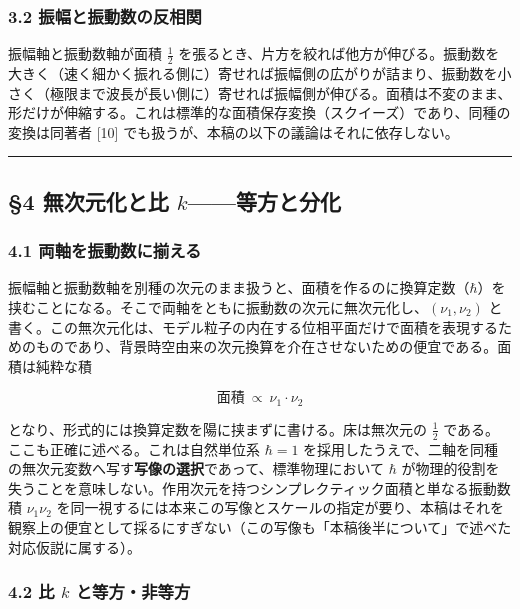 \documentclass[
]{ltjsarticle}
\begin{document}
\subsubsection{3.2
振幅と振動数の反相関}\label{ux632fux5e45ux3068ux632fux52d5ux6570ux306eux53cdux76f8ux95a2}

振幅軸と振動数軸が面積 \(\tfrac12\)
を張るとき、片方を絞れば他方が伸びる。振動数を大きく（速く細かく振れる側に）寄せれば振幅側の広がりが詰まり、振動数を小さく（極限まで波長が長い側に）寄せれば振幅側が伸びる。面積は不変のまま、形だけが伸縮する。これは標準的な面積保存変換（スクイーズ）であり、同種の変換は同著者
{[}10{]} でも扱うが、本稿の以下の議論はそれに依存しない。

\begin{center}\rule{0.5\linewidth}{0.5pt}\end{center}

\subsection{\texorpdfstring{§4 無次元化と比
\(k\)------等方と分化}{§4 無次元化と比 k------等方と分化}}\label{ux7121ux6b21ux5143ux5316ux3068ux6bd4-kux7b49ux65b9ux3068ux5206ux5316}

\subsubsection{4.1
両軸を振動数に揃える}\label{ux4e21ux8ef8ux3092ux632fux52d5ux6570ux306bux63c3ux3048ux308b}

振幅軸と振動数軸を別種の次元のまま扱うと、面積を作るのに換算定数（\(\hbar\)）を挟むことになる。そこで両軸をともに振動数の次元に無次元化し、\((\nu_1,\nu_2)\)
と書く。この無次元化は、モデル粒子の内在する位相平面だけで面積を表現するためのものであり、背景時空由来の次元換算を介在させないための便宜である。面積は純粋な積

\[\text{面積}\ \propto\ \nu_1\cdot\nu_2\]

となり、形式的には換算定数を陽に挟まずに書ける。床は無次元の
\(\tfrac12\) である。ここも正確に述べる。これは自然単位系 \(\hbar=1\)
を採用したうえで、二軸を同種の無次元変数へ写す\textbf{写像の選択}であって、標準物理において
\(\hbar\)
が物理的役割を失うことを意味しない。作用次元を持つシンプレクティック面積と単なる振動数積
\(\nu_1\nu_2\)
を同一視するには本来この写像とスケールの指定が要り、本稿はそれを観察上の便宜として採るにすぎない（この写像も「本稿後半について」で述べた対応仮説に属する）。

\subsubsection{\texorpdfstring{4.2 比 \(k\)
と等方・非等方}{4.2 比 k と等方・非等方}}\label{ux6bd4-k-ux3068ux7b49ux65b9ux975eux7b49ux65b9}
\end{document}

